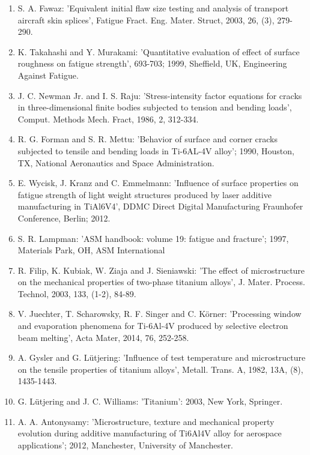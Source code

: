 \documentclass[10pt]{article}
\begin{document}
\begin{enumerate}
  \item S. A. Fawaz: 'Equivalent initial flaw size testing and analysis of transport aircraft skin splices', Fatigue Fract. Eng. Mater. Struct, 2003, 26, (3), 279-290.

  \item K. Takahashi and Y. Murakami: 'Quantitative evaluation of effect of surface roughness on fatigue strength', 693-703; 1999, Sheffield, UK, Engineering Against Fatigue.

  \item J. C. Newman Jr. and I. S. Raju: 'Stress-intensity factor equations for cracks in three-dimensional finite bodies subjected to tension and bending loads', Comput. Methods Mech. Fract, 1986, 2, 312-334.

  \item R. G. Forman and S. R. Mettu: 'Behavior of surface and corner cracks subjected to tensile and bending loads in Ti-6AL-4V alloy'; 1990, Houston, TX, National Aeronautics and Space Administration.

  \item E. Wycisk, J. Kranz and C. Emmelmann: 'Influence of surface properties on fatigue strength of light weight structures produced by laser additive manufacturing in TiAl6V4', DDMC Direct Digital Manufacturing Fraunhofer Conference, Berlin; 2012.

  \item S. R. Lampman: 'ASM handbook: volume 19: fatigue and fracture'; 1997, Materials Park, OH, ASM International

  \item R. Filip, K. Kubiak, W. Ziaja and J. Sieniawski: 'The effect of microstructure on the mechanical properties of two-phase titanium alloys', J. Mater. Process. Technol, 2003, 133, (1-2), 84-89.

  \item V. Juechter, T. Scharowsky, R. F. Singer and C. Körner: 'Processing window and evaporation phenomena for Ti-6Al-4V produced by selective electron beam melting', Acta Mater, 2014, 76, 252-258.

  \item A. Gysler and G. Lütjering: 'Influence of test temperature and microstructure on the tensile properties of titanium alloys', Metall. Trans. A, 1982, 13A, (8), 1435-1443.

  \item G. Lütjering and J. C. Williams: 'Titanium': 2003, New York, Springer.

  \item A. A. Antonysamy: 'Microstructure, texture and mechanical property evolution during additive manufacturing of Ti6Al4V alloy for aerospace applications'; 2012, Manchester, University of Manchester.


\end{enumerate}
\end{document}
